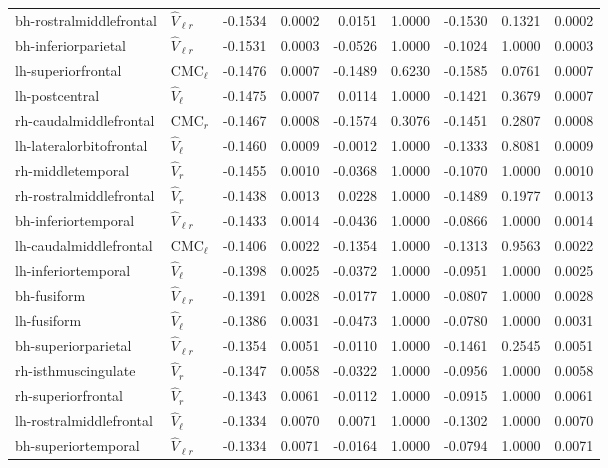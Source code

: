 \documentclass{article}
\begin{document}
\begin{table}
\begin{tabular}{llrrrrrrr}
	bh-rostralmiddlefrontal & $\hat{V}_{\ell r}$ & -0.1534 & 0.0002 & 0.0151 & 1.0000 & -0.1530 & 0.1321 & 0.0002 \\
	bh-inferiorparietal & $\hat{V}_{\ell r}$ & -0.1531 & 0.0003 & -0.0526 & 1.0000 & -0.1024 & 1.0000 & 0.0003 \\
	lh-superiorfrontal & $\text{CMC}_{\ell}$ & -0.1476 & 0.0007 & -0.1489 & 0.6230 & -0.1585 & 0.0761 & 0.0007 \\
	lh-postcentral & $\hat{V}_{\ell}$ & -0.1475 & 0.0007 & 0.0114 & 1.0000 & -0.1421 & 0.3679 & 0.0007 \\
	rh-caudalmiddlefrontal & $\text{CMC}_r$ & -0.1467 & 0.0008 & -0.1574 & 0.3076 & -0.1451 & 0.2807 & 0.0008 \\
	lh-lateralorbitofrontal & $\hat{V}_{\ell}$ & -0.1460 & 0.0009 & -0.0012 & 1.0000 & -0.1333 & 0.8081 & 0.0009 \\
	rh-middletemporal & $\hat{V}_{r}$ & -0.1455 & 0.0010 & -0.0368 & 1.0000 & -0.1070 & 1.0000 & 0.0010 \\
	rh-rostralmiddlefrontal & $\hat{V}_{r}$ & -0.1438 & 0.0013 & 0.0228 & 1.0000 & -0.1489 & 0.1977 & 0.0013 \\
	bh-inferiortemporal & $\hat{V}_{\ell r}$ & -0.1433 & 0.0014 & -0.0436 & 1.0000 & -0.0866 & 1.0000 & 0.0014 \\
	lh-caudalmiddlefrontal & $\text{CMC}_{\ell}$ & -0.1406 & 0.0022 & -0.1354 & 1.0000 & -0.1313 & 0.9563 & 0.0022 \\
	lh-inferiortemporal & $\hat{V}_{\ell}$ & -0.1398 & 0.0025 & -0.0372 & 1.0000 & -0.0951 & 1.0000 & 0.0025 \\
	bh-fusiform & $\hat{V}_{\ell r}$ & -0.1391 & 0.0028 & -0.0177 & 1.0000 & -0.0807 & 1.0000 & 0.0028 \\
	lh-fusiform & $\hat{V}_{\ell}$ & -0.1386 & 0.0031 & -0.0473 & 1.0000 & -0.0780 & 1.0000 & 0.0031 \\
	bh-superiorparietal & $\hat{V}_{\ell r}$ & -0.1354 & 0.0051 & -0.0110 & 1.0000 & -0.1461 & 0.2545 & 0.0051 \\
	rh-isthmuscingulate & $\hat{V}_{r}$ & -0.1347 & 0.0058 & -0.0322 & 1.0000 & -0.0956 & 1.0000 & 0.0058 \\
	rh-superiorfrontal & $\hat{V}_{r}$ & -0.1343 & 0.0061 & -0.0112 & 1.0000 & -0.0915 & 1.0000 & 0.0061 \\
	lh-rostralmiddlefrontal & $\hat{V}_{\ell}$ & -0.1334 & 0.0070 & 0.0071 & 1.0000 & -0.1302 & 1.0000 & 0.0070 \\
	bh-superiortemporal & $\hat{V}_{\ell r}$ & -0.1334 & 0.0071 & -0.0164 & 1.0000 & -0.0794 & 1.0000 & 0.0071 \\

\end{tabular}
\end{table}
\end{document}
